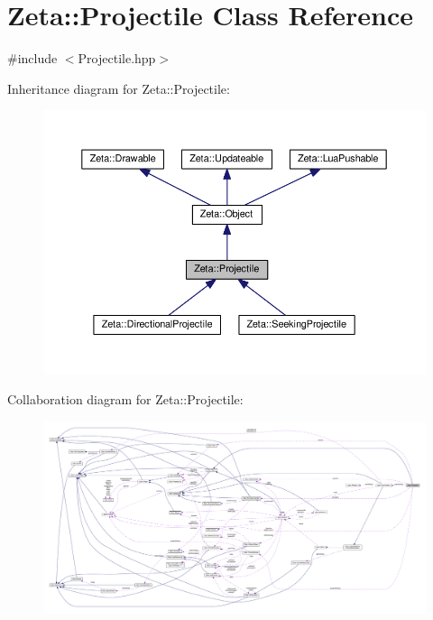 \hypertarget{classZeta_1_1Projectile}{\section{Zeta\+:\+:Projectile Class Reference}
\label{classZeta_1_1Projectile}
}


{\ttfamily \#include $<$Projectile.\+hpp$>$}



Inheritance diagram for Zeta\+:\+:Projectile\+:\nopagebreak
\begin{figure}[H]
\begin{center}
\leavevmode
\includegraphics[width=350pt]{classZeta_1_1Projectile__inherit__graph}
\end{center}
\end{figure}


Collaboration diagram for Zeta\+:\+:Projectile\+:
\nopagebreak
\begin{figure}[H]
\begin{center}
\leavevmode
\includegraphics[width=350pt]{classZeta_1_1Projectile__coll__graph}
\end{center}
\end{figure}
